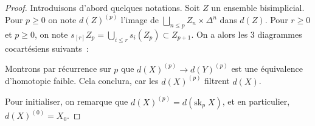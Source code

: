 \documentclass{amsart}
\theoremstyle{plain}
\theoremstyle{definition}
\theoremstyle{remark}
\newcommand{\sk}[2]{\mathrm{sk}_{#1}\;{#2}}
\newcommand{\ra}{\rightarrow}
\begin{document}
\begin{proof}\cite[IV.1.7]{Goer}
  Introduisons d'abord quelques notations.
  Soit $Z$ un ensemble bisimplicial. Pour $p\geq 0$ on note $d(Z)^{(p)}$ l'image de $\bigsqcup_ {n\leq p} Z_n\times\Delta^n$ dans $d(Z)$.
  Pour $r\geq 0$ et $p\geq 0$, on note $s_{[r]}Z_p=\bigcup_{i\leq r}s_i(Z_p)\subset Z_{p+1}$. On a alors les $3$ diagrammes cocartésiens suivants~:
  \begin{center}
  \end{center}
  Montrons par récurrence sur $p$ que $d(X)^{(p)}\ra d(Y)^{(p)}$ est une équivalence d'homotopie faible. Cela conclura, car les $d(X)^{(p)}$
  filtrent $d(X)$.

  Pour initialiser, on remarque que $d(X)^{(p)}=d(\sk{p}{X})$, et en particulier, $d(X)^{(0)}=X_0$.


\end{proof}
\end{document}
